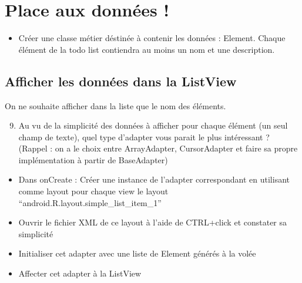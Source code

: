 \documentclass{article}
\begin{document}
 \section{Place aux données !}
 \begin{itemize}
  \item Créer une classe métier déstinée à contenir les données : Element.
  Chaque élément de la todo list contiendra au moins un nom et une description.
 \end{itemize}
 \subsection{Afficher les données dans la ListView}
    On ne souhaite afficher dans la liste que le nom des éléments.
      \begin{enumerate}
 \setcounter{enumi}{8}
\item Au vu de la simplicité des données à afficher pour chaque élément (un seul
champ de texte), quel type d'adapter vous parait le plus intéressant ? (Rappel :
on a le choix entre ArrayAdapter, CursorAdapter et faire sa propre implémentation à partir de BaseAdapter)
\end{enumerate}
 \begin{itemize}
  \item Dans onCreate : Créer une instance de l'adapter correspondant en
  utilisant comme layout pour chaque view le layout ``android.R.layout.simple\_list\_item\_1''
  \item Ouvrir le fichier XML de ce layout à l'aide de CTRL+click et constater
  sa simplicité
  \item Initialiser cet adapter avec une liste de Element générés à la volée
  \item Affecter cet adapter à la ListView
 \end{itemize}
\end{document}
